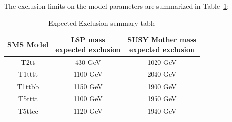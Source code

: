 The exclusion limits on the model parameters are summarized in Table~\ref{tab:c4limitsummary}:

\begin{table}[htbp]
\fontsize{10 pt}{1.2 em}
\selectfont
\begin{centering}
\caption{\label{tab:c4limitsummary} Expected Exclusion summary table}
\hspace*{-4ex}
\begin{tabular}{|c|c|c|}
\hline
SMS Model & \specialcell{LSP mass \\ expected exclusion} & \specialcell{SUSY Mother mass \\ expected exclusion} \\
\hline
T2tt & 430 GeV & 1020 GeV \\
\hline
T1tttt & 1100 GeV & 2040 GeV \\
\hline
T1ttbb & 1150 GeV & 1900 GeV \\
\hline
T5tttt & 1100 GeV & 1950 GeV \\
\hline
T5ttcc & 1120 GeV & 1940 GeV \\
\hline
\end{tabular}
\par\end{centering}
\end{table}
